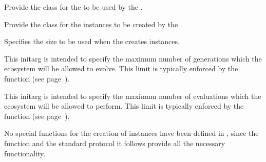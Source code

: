 \filbreak

{\samepage
{}

  Provide the class for the  to be used by the
.
\par}%

\filbreak

{\samepage
{}

  Provide the class for the  instances to be created by
the .
\par}%

\filbreak

{\samepage
{}

  Specifies the size to be used when the  creates
 instances.
\par}%

\filbreak

{\samepage
{}

This initarg is intended to specify the maximum number of generations which the ecosystem
will be allowed to evolve.
This limit is typically enforced by the  function
(see page~\pageref{evolution-termination-p}).
	
\par}%

\filbreak

{\samepage
{}

This initarg is intended to specify the maximum number of evaluations which the ecosystem
will be allowed to perform.
This limit is typically enforced by the  function
(see page~\pageref{evolution-termination-p}).

\par}%

\filbreak
\gap

{\samepage
{}

No special functions for the creation of  instances have been defined
in \geco, since the  function and the standard  protocol
it follows provide all the necessary functionality.
\par}%

\filbreak

